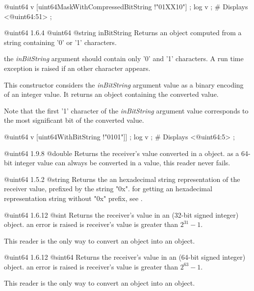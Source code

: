 \exempleDeuxLignes
{@uint64 v [uint64MaskWithCompressedBitString !"01XX10"] ;}
{log v ; \# Displays <@uint64:51> ;}



{@uint64}
{1.6.4}
{@uint64}
{@string inBitString}
{Returns an  object computed from a string containing '0' or '1' characters.}
{the \emph{inBitString} argument should contain only '0' and '1' characters. A run time exception is raised if an other character appears.

This constructor considers the \emph{inBitString} argument value as a binary encoding of an integer value. It returns an  object containing the converted value.

Note that the first '1' character of the \emph{inBitString} argument value corresponds to the most significant bit of the converted value.}

\exempleDeuxLignes
{@uint64 v [uint64WithBitString !"0101"]] ;}
{log v ; \# Displays <@uint64:5> ;}




{@uint64}
{1.9.8}
{@double}
{Returns the receiver's value converted in a  object.}
{as a 64-bit integer value can always be converted in a  value, this reader never fails.}



{@uint64}
{1.5.2}
{@string}
{Returns the an hexadecimal string representation of the receiver value, prefixed by the string "0x".}
{for getting an hexadecimal representation string without "0x" prefix, see .}





{@uint64}
{1.6.12}
{@sint}
{Returns the receiver's value in an  (32-bit signed integer) object.}
{an error is raised is receiver's value is greater than $2^{31}-1$.}

This reader is the only way to convert an  object into an  object.




{@uint64}
{1.6.12}
{@sint64}
{Returns the receiver's value in an  (64-bit signed integer) object.}
{an error is raised is receiver's value is greater than $2^{63}-1$.}

This reader is the only way to convert an  object into an  object.


